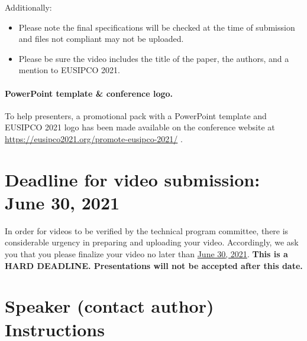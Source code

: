 \documentclass[english,a4paper,11pt,oneside,onecolumn]{article}
\begin{document}
Additionally:
\begin{itemize}
    \item Please note the final specifications will be checked at the time of submission and files not compliant may not be uploaded.

\item Please be sure the video includes the title of the paper, the authors, and a mention to EUSIPCO 2021.
\end{itemize}

\paragraph{PowerPoint template \& conference logo.} To help presenters, a promotional pack with  a PowerPoint template and EUSIPCO 2021 logo has been made available on the conference website at \url{https://eusipco2021.org/promote-eusipco-2021/} .

\section{Deadline for video submission: June 30, 2021}

In order for videos to be verified by the technical program committee, there is considerable urgency in preparing and uploading your video. Accordingly, we ask you that you please finalize your video no later than \underline{June 30, 2021}. \textbf{This is a HARD DEADLINE. Presentations will not be accepted after this date.}

\section{Speaker (contact author) Instructions}
\end{document}
